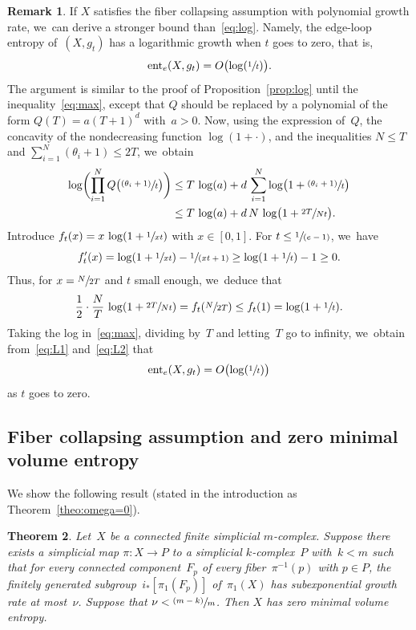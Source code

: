 \documentclass[11pt]{article}
\let\oldsfrac\sfrac
\renewcommand{\sfrac}[2]{{\oldsfrac{#1}{#2}}}
\newcommand{\psfrac}[2]{\sfrac{(#1)}{#2}}
\newcommand{\spfrac}[2]{\sfrac{#1}{(#2)}}
\newtheorem{theorem}{Theorem}[section]
\theoremstyle{definition}
\newtheorem{remark}[theorem]{Remark}
\numberwithin{equation}{section}
\begin{document}
\begin{remark}
If $X$ satisfies the fiber collapsing assumption with polynomial growth rate, we~can derive a stronger bound than~\eqref{eq:log}.
Namely, the edge-loop entropy of~$(X,g_t)$ has a logarithmic growth when $t$ goes to zero, that is,
\[
\eent_e(X,g_t) = O \bigl(\log(\sfrac{1}{t}) \bigr).
\]
The argument is similar to the proof of Proposition~\ref{prop:log} until the inequality~\eqref{eq:max}, except that $Q$ should be replaced by a polynomial of the form $Q(T)=a(T+1)^d$ with~$a>0$.
Now, using the expression of~$Q$, the concavity of the nondecreasing function $\log(1+\cdot)$, and the inequalities $N \leq T$ and $\sum_{i=1}^N (\theta_i+1) \leq 2T$, we~obtain
\begin{equation}\label{eq:L1}
\begin{aligned}
\log \biggl(\prod_{i=1}^N Q \bigl(\psfrac{\theta_i+1}{t} \bigr) \biggr) & \leq T \, \log(a) + d \, \sum_{i=1}^N \log \bigl( 1+\psfrac{\theta_i+1}{t} \bigr) \\
 & \leq T \, \log(a) + d \, N \, \log \bigl( 1+\sfrac{2T}{Nt} \bigr).
\end{aligned}
\end{equation}
Introduce $f_t(x) = x \, \log(1+\sfrac{1}{xt})$ with $x \in [0,1]$.
For $t \leq \spfrac{1}{e-1}$, we~have
\[
f'_t(x) = \log(1+\sfrac{1}{xt}) - \spfrac{1}{xt+1} \geq \log(1+\sfrac{1}{t}) -1 \geq 0.
\]
Thus, for $x=\sfrac{N}{2T}$ and $t$ small enough, we~deduce that
\begin{equation} \label{eq:L2}
\frac{1}{2} \cdot \frac{N}{T} \, \log(1+\sfrac{2T}{Nt}) = f_t(\sfrac{N}{2T}) \leq f_t(1) = \log(1+\sfrac{1}{t}).
\end{equation}
Taking the log in~\eqref{eq:max}, dividing by~$T$ and letting~$T$ go to infinity, we~obtain from~\eqref{eq:L1} and~\eqref{eq:L2} that
\[
\eent_e(X,g_t) = O \bigl(\log(\sfrac{1}{t}) \bigr)
\]
as $t$ goes to zero.
\end{remark}

\subsection{Fiber collapsing assumption and zero minimal volume entropy}

We show the following result (stated in the introduction as Theorem~\ref{theo:omega=0}).

\begin{theorem} \label{theo:A}
Let~$X$ be a connected finite simplicial $m$\nobreakdash-complex.
Suppose there exists a simplicial map $\pi:X \to P$ to a simplicial $k$-complex~$P$ with~$k<m$ such that for every connected component~$F_p$ of every fiber~$\pi^{-1}(p)$ with $p \in P$, the finitely generated subgroup~$i_*[\pi_1(F_p)]$ of~$\pi_1(X)$ has subexponential growth rate at most~$\nu$.
Suppose that $\nu < \psfrac{m-k}{m}$.
Then $X$ has zero minimal volume entropy.
\end{theorem}
\end{document}
